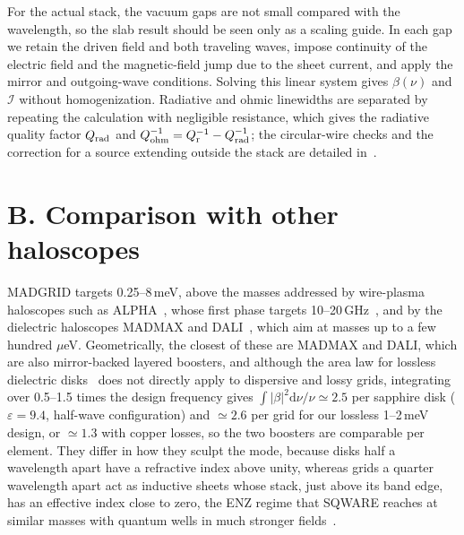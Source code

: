 \documentclass[
  aps,prl,reprint,superscriptaddress,
  amsmath,amssymb,floatfix,nofootinbib
]{revtex4-2}
\newcommand{\Qr}{Q_{\rm r}}
\newcommand{\dd}{\mathrm d}
\begin{document}
For the actual stack, the vacuum gaps are not small compared with the wavelength, so the slab result should be seen only as a scaling guide. In each gap we retain the driven field and both traveling waves, impose continuity of the electric field and the magnetic-field jump due to the sheet current, and apply the mirror and outgoing-wave conditions. Solving this linear system gives $\beta(\nu)$ and $\mathcal I$ without homogenization. Radiative and ohmic linewidths are separated by repeating the calculation with negligible resistance, which gives the radiative quality factor $Q_{\rm rad}$ and $Q_{\rm ohm}^{-1}=\Qr^{-1}-Q_{\rm rad}^{-1}$; the circular-wire checks and the correction for a source extending outside the stack are detailed in~\cite{SM}.


\renewcommand{\theequation}{B\arabic{equation}}
\renewcommand{\theHequation}{B.\arabic{equation}}
\setcounter{equation}{0}
\section*{B. Comparison with other haloscopes}

MADGRID targets 0.25--8\,meV, above the masses addressed by wire-plasma haloscopes such as ALPHA~\cite{Lawson:2019brd,ALPHA:2022rxj}, whose first phase targets 10--20\,GHz~\cite{ALPHA:2026phase1}, and by the dielectric haloscopes MADMAX and DALI~\cite{MADMAX:2019pub,DeMiguel:2020rpn}, which aim at masses up to a few hundred $\mu$eV. Geometrically, the closest of these are MADMAX and DALI, which are also mirror-backed layered boosters, and although the area law for lossless dielectric disks~\cite{Millar:2016cjp} does not directly apply to dispersive and lossy grids, integrating over 0.5--1.5 times the design frequency gives $\int|\beta|^2\dd\nu/\nu\simeq2.5$ per sapphire disk ($\varepsilon=9.4$, half-wave configuration) and $\simeq2.6$ per grid for our lossless 1--2\,meV design, or $\simeq1.3$ with copper losses, so the two boosters are comparable per element. They differ in how they sculpt the mode, because disks half a wavelength apart have a refractive index above unity, whereas grids a quarter wavelength apart act as inductive sheets whose stack, just above its band edge, has an effective index close to zero, the ENZ regime that SQWARE reaches at similar masses with quantum wells in much stronger fields~\cite{Mehrani:2025ryc}.
\end{document}

